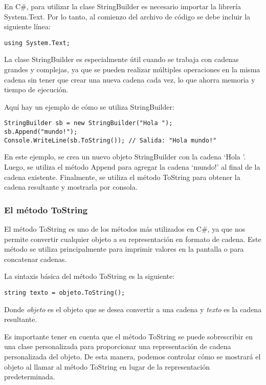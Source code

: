 \documentclass[executivepaper]{article}
\begin{document}
En C\#, para utilizar la clase StringBuilder es necesario importar la librería System.Text. Por lo tanto, al comienzo del archivo de código se debe incluir la siguiente línea:
\begin{lstlisting}
using System.Text;    
\end{lstlisting}

La clase StringBuilder es especialmente útil cuando se trabaja con cadenas grandes y complejas, ya que se pueden realizar múltiples operaciones en la misma cadena sin tener que crear una nueva cadena cada vez, lo que ahorra memoria y tiempo de ejecución.

Aquí hay un ejemplo de cómo se utiliza StringBuilder:
\begin{lstlisting}
StringBuilder sb = new StringBuilder("Hola ");
sb.Append("mundo!");
Console.WriteLine(sb.ToString()); // Salida: "Hola mundo!"    
\end{lstlisting}
En este ejemplo, se crea un nuevo objeto StringBuilder con la cadena \enquote*{Hola }. Luego, se utiliza el método Append para agregar la cadena \enquote*{mundo!} al final de la cadena existente. Finalmente, se utiliza el método ToString para obtener la cadena resultante y mostrarla por consola.

\subsubsection*{El método ToString}

El método ToString es uno de los métodos más utilizados en C\#, ya que nos permite convertir cualquier objeto a su representación en formato de cadena. Este método se utiliza principalmente para imprimir valores en la pantalla o para concatenar cadenas.

La sintaxis básica del método ToString es la siguiente:

\begin{lstlisting}
string texto = objeto.ToString();
\end{lstlisting}

Donde \emph{objeto} es el objeto que se desea convertir a una cadena y \emph{texto} es la cadena resultante.

Es importante tener en cuenta que el método ToString se puede sobrescribir en una clase personalizada para proporcionar una representación de cadena personalizada del objeto. De esta manera, podemos controlar cómo se mostrará el objeto al llamar al método ToString en lugar de la representación predeterminada.
\end{document}

